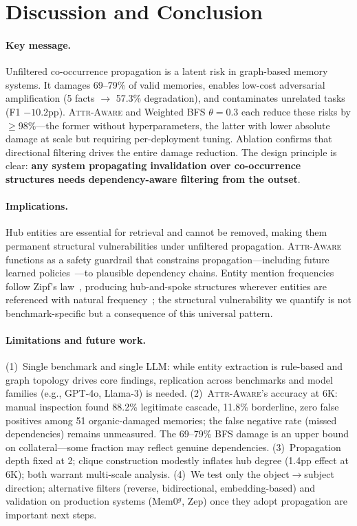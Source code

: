 \documentclass{article}
\newcommand{\attraware}{\textsc{Attr-Aware}}
\begin{document}
\section{Discussion and Conclusion}
\label{sec:conclusion}

\paragraph{Key message.}
Unfiltered co-occurrence propagation is a latent risk in graph-based memory systems.
It damages 69--79\% of valid memories, enables low-cost adversarial amplification (5 facts $\rightarrow$ 57.3\% degradation), and contaminates unrelated tasks (F1 $-10.2$pp).
\attraware{} and Weighted BFS $\theta{=}0.3$ each reduce these risks by $\geq$98\%---the former without hyperparameters, the latter with lower absolute damage at scale but requiring per-deployment tuning.
Ablation confirms that directional filtering drives the entire damage reduction.
The design principle is clear: \textbf{any system propagating invalidation over co-occurrence structures needs dependency-aware filtering from the outset}.

\paragraph{Implications.}
Hub entities are essential for retrieval and cannot be removed, making them permanent structural vulnerabilities under unfiltered propagation.
\attraware{} functions as a safety guardrail that constrains propagation---including future learned policies~\citep{mars_2025}---to plausible dependency chains.
Entity mention frequencies follow Zipf's law~\citep{zipf_1949}, producing hub-and-spoke structures wherever entities are referenced with natural frequency~\citep{steyvers_semantic_2005, barabasi_scalefree_1999}; the structural vulnerability we quantify is not benchmark-specific but a consequence of this universal pattern.

\paragraph{Limitations and future work.}
(1)~Single benchmark and single LLM: while entity extraction is rule-based and graph topology drives core findings, replication across benchmarks and model families (e.g., GPT-4o, Llama-3) is needed.
(2)~\attraware{}'s accuracy at 6K: manual inspection found 88.2\% legitimate cascade, 11.8\% borderline, zero false positives among 51 organic-damaged memories; the false negative rate (missed dependencies) remains unmeasured.
The 69--79\% BFS damage is an upper bound on collateral---some fraction may reflect genuine dependencies.
(3)~Propagation depth fixed at 2; clique construction modestly inflates hub degree (1.4pp effect at 6K); both warrant multi-scale analysis.
(4)~We test only the object$\rightarrow$subject direction; alternative filters (reverse, bidirectional, embedding-based) and validation on production systems (Mem0$^g$, Zep) once they adopt propagation are important next steps.
\end{document}

